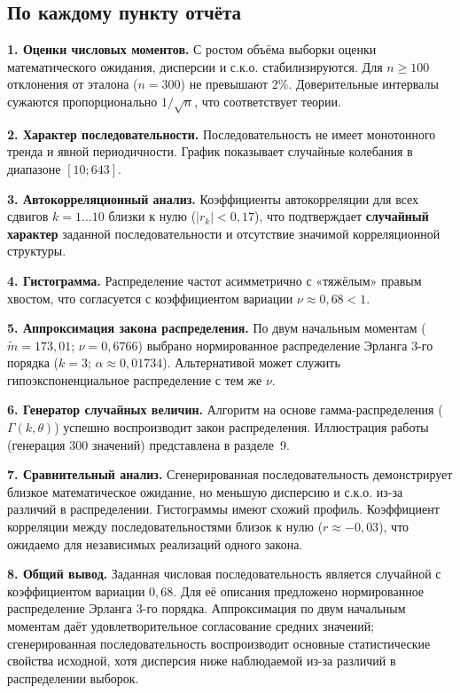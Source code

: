 \documentclass[a4paper,12pt]{article}
\begin{document}
\subsection{По каждому пункту отчёта}

\textbf{1. Оценки числовых моментов.} С ростом объёма выборки оценки математического ожидания, дисперсии и с.к.о. стабилизируются. Для $n \geq 100$ отклонения от эталона ($n=300$) не превышают 2\%. Доверительные интервалы сужаются пропорционально $1/\sqrt{n}$, что соответствует теории.

\textbf{2. Характер последовательности.} Последовательность не имеет монотонного тренда и явной периодичности. График показывает случайные колебания в диапазоне $[10; 643]$.

\textbf{3. Автокорреляционный анализ.} Коэффициенты автокорреляции для всех сдвигов $k=1\dots10$ близки к нулю ($|r_k| < 0{,}17$), что подтверждает \textbf{случайный характер} заданной последовательности и отсутствие значимой корреляционной структуры.

\textbf{4. Гистограмма.} Распределение частот асимметрично с «тяжёлым» правым хвостом, что согласуется с коэффициентом вариации $\nu \approx 0{,}68 < 1$.

\textbf{5. Аппроксимация закона распределения.} По двум начальным моментам ($\tilde{m}=173{,}01$; $\nu=0{,}6766$) выбрано нормированное распределение Эрланга 3-го порядка ($k=3$; $\alpha \approx 0{,}01734$). Альтернативой может служить гипоэкспоненциальное распределение с тем же $\nu$.

\textbf{6. Генератор случайных величин.} Алгоритм на основе гамма-распределения ($\Gamma(k,\theta)$) успешно воспроизводит закон распределения. Иллюстрация работы (генерация 300 значений) представлена в разделе~9.

\textbf{7. Сравнительный анализ.} Сгенерированная последовательность демонстрирует близкое математическое ожидание, но меньшую дисперсию и с.к.о. из-за различий в распределении. Гистограммы имеют схожий профиль. Коэффициент корреляции между последовательностями близок к нулю ($r \approx -0{,}03$), что ожидаемо для независимых реализаций одного закона.

\textbf{8. Общий вывод.} Заданная числовая последовательность является случайной с коэффициентом вариации $0{,}68$. Для её описания предложено нормированное распределение Эрланга 3-го порядка. Аппроксимация по двум начальным моментам даёт удовлетворительное согласование средних значений; сгенерированная последовательность воспроизводит основные статистические свойства исходной, хотя дисперсия ниже наблюдаемой из-за различий в распределении выборок.
\end{document}
